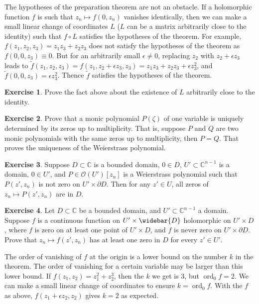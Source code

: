 \documentclass[12pt,openany]{book}
\newcommand{\ord}{\operatorname{ord}}
\newcommand{\C}{{\mathbb{C}}}
\newcommand{\sO}{{\mathscr{O}}}
\theoremstyle{plain}
\theoremstyle{remark}
\theoremstyle{definition}
\newenvironment{exbox}{%
    \def\FrameCommand{\vrule width 1pt \relax\hspace{10pt}}%
    \MakeFramed {\advance \hsize -\width \FrameRestore}%
}{%
    \endMakeFramed
}
\theoremstyle{exercise}
\newtheorem{exercise}{Exercise}[section]
\theoremstyle{example}
\begin{document}
The hypotheses of the preparation theorem are not an obstacle.  If a holomorphic
function $f$ is such that $z_n \mapsto f(0,z_n)$ vanishes identically,
then we can make a small linear change of
coordinates $L$ ($L$ can be a matrix arbitrarily close to the identity) such
that $f \circ L$ satisfies the hypotheses of the theorem.
For example, $f(z_1,z_2,z_3) = z_1z_3+z_2z_3$ does not satisfy the
hypotheses of the theorem as $f(0,0,z_3) \equiv 0$.  But for an arbitrarily
small $\epsilon \not= 0$, replacing
$z_2$ with $z_2 + \epsilon z_3$ leads to $\tilde{f}(z_1,z_2,z_3)
= f(z_1,z_2+\epsilon z_3,z_3) = 
z_1z_3+z_2z_3 + \epsilon z_3^2$, and $\tilde{f}(0,0,z_3) = \epsilon z_3^2$.
Thence $\tilde{f}$
satisfies the hypotheses of the theorem.

\begin{exbox}
\begin{exercise}
Prove the fact above about the existence of $L$ arbitrarily close to the
identity.
\end{exercise}

\begin{exercise}
Prove that a monic polynomial $P(\zeta)$ of one variable is
uniquely determined by its zeros up to multiplicity.  That is, suppose
$P$ and $Q$ are two monic polynomials with the same zeros
up to multiplicity,
then $P=Q$.  That proves the uniqueness of the Weierstrass polynomial.
\end{exercise}

\begin{exercise}
Suppose $D \subset \C$ is a bounded domain, $0 \in D$,
$U' \subset \C^{n-1}$ is a domain, $0 \in U'$,
and $P \in \sO(U')[z_n]$ is a Weierstrass polynomial
such that $P(z',z_n)$ is not zero on $U' \times \partial D$.
Then for any $z' \in U$, all zeros of $z_n \mapsto P(z',z_n)$ are in $D$.
\end{exercise}

\begin{exercise}
Let $D \subset \C$ be a bounded domain,
and
$U' \subset \C^{n-1}$ a domain.
Suppose
$f$ is a continuous function on
$U' \times \widebar{D}$ holomorphic on $U' \times D$,
where $f$ is zero on at least one point
of $U' \times D$, and $f$ is never zero on
$U' \times \partial D$.
Prove that
$z_n \mapsto f(z',z_n)$ has at least one zero in $D$ for every $z' \in U'$.
\pagebreak[2]
\end{exercise}
\end{exbox}

The order of vanishing of $f$ at the origin is a lower bound
on the number $k$ in the theorem.  The order of vanishing for a certain
variable may be larger than this lower bound.  If $f(z_1,z_2) =
z_1^2 + z_2^3$, then the $k$ we get is 3, but $\ord_0 f = 2$.
We can make a small
linear change of coordinates to ensure $k = \ord_0 f$.
With the $f$ as above, $f(z_1 + \epsilon z_2,z_2)$ gives $k = 2$
as expected.
\end{document}

